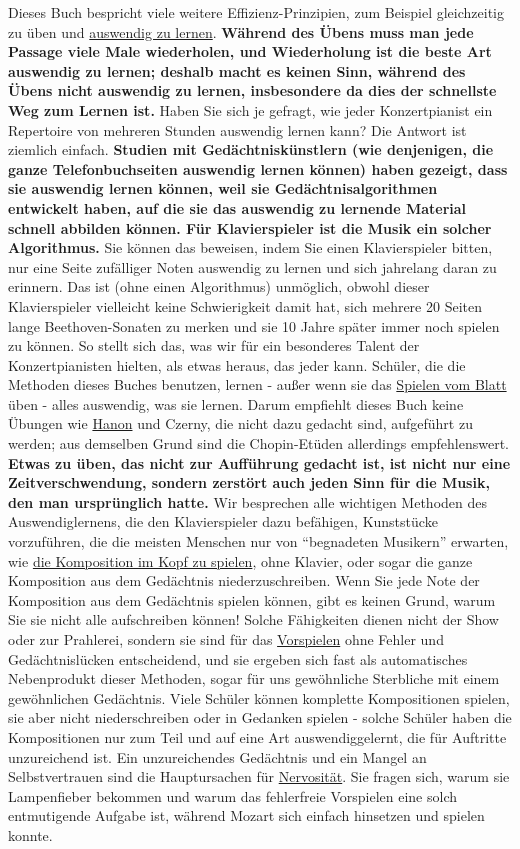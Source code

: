 Dieses Buch bespricht viele weitere Effizienz-Prinzipien, zum Beispiel gleichzeitig zu üben und \hyperlink{c1iii6a}{auswendig zu lernen}.
 \textbf{Während des Übens muss man jede Passage viele Male wiederholen, und Wiederholung ist die beste Art auswendig zu lernen; deshalb macht es keinen Sinn, während des Übens nicht auswendig zu lernen, insbesondere da dies der schnellste Weg zum Lernen ist.}
 Haben Sie sich je gefragt, wie jeder Konzertpianist ein Repertoire von mehreren Stunden auswendig lernen kann?
 Die Antwort ist ziemlich einfach.
 \textbf{Studien mit Gedächtniskünstlern (wie denjenigen, die ganze Telefonbuchseiten auswendig lernen können) haben gezeigt, dass sie auswendig lernen können, weil sie Gedächtnisalgorithmen entwickelt haben, auf die sie das auswendig zu lernende Material schnell abbilden können.
 Für Klavierspieler ist die Musik ein solcher Algorithmus.}
 Sie können das beweisen, indem Sie einen Klavierspieler bitten, nur eine Seite zufälliger Noten auswendig zu lernen und sich jahrelang daran zu erinnern.
 Das ist (ohne einen Algorithmus) unmöglich, obwohl dieser Klavierspieler vielleicht keine Schwierigkeit damit hat, sich mehrere 20 Seiten lange Beethoven-Sonaten zu merken und sie 10 Jahre später immer noch spielen zu können.
 So stellt sich das, was wir für ein besonderes Talent der Konzertpianisten hielten, als etwas heraus, das jeder kann.
 Schüler, die die Methoden dieses Buches benutzen, lernen - außer wenn sie das \hyperlink{c1iii11}{Spielen vom Blatt} üben - alles auswendig, was sie lernen.
 Darum empfiehlt dieses Buch keine Übungen wie \hyperlink{c1iii7h}{Hanon} und Czerny, die nicht dazu gedacht sind, aufgeführt zu werden; aus demselben Grund sind die Chopin-Etüden allerdings empfehlenswert.
 \textbf{Etwas zu üben, das nicht zur Aufführung gedacht ist, ist nicht nur eine Zeitverschwendung, sondern zerstört auch jeden Sinn für die Musik, den man ursprünglich hatte.}
 Wir besprechen alle wichtigen Methoden des Auswendiglernens, die den Klavierspieler dazu befähigen, Kunststücke vorzuführen, die die meisten Menschen nur von \enquote{begnadeten Musikern} erwarten, wie 
 \hyperlink{c1ii12mental}{die Komposition im Kopf zu spielen}, ohne Klavier, oder sogar die ganze Komposition aus dem Gedächtnis niederzuschreiben.
 Wenn Sie jede Note der Komposition aus dem Gedächtnis spielen können, gibt es keinen Grund, warum Sie sie nicht alle aufschreiben können!
 Solche Fähigkeiten dienen nicht der Show oder zur Prahlerei, sondern sie sind für das \hyperlink{c1iii14}{Vorspielen} ohne Fehler und Gedächtnislücken entscheidend, und sie ergeben sich fast als automatisches Nebenprodukt dieser Methoden, sogar für uns gewöhnliche Sterbliche mit einem gewöhnlichen Gedächtnis.
 Viele Schüler können komplette Kompositionen spielen, sie aber nicht niederschreiben oder in Gedanken spielen - solche Schüler haben die Kompositionen nur zum Teil und auf eine Art auswendiggelernt, die für Auftritte unzureichend ist.
 Ein unzureichendes Gedächtnis und ein Mangel an Selbstvertrauen sind die Hauptursachen für \hyperlink{c1iii15}{Nervosität}.
 Sie fragen sich, warum sie Lampenfieber bekommen und warum das fehlerfreie Vorspielen eine solch entmutigende Aufgabe ist, während Mozart sich einfach hinsetzen und spielen konnte.
 

